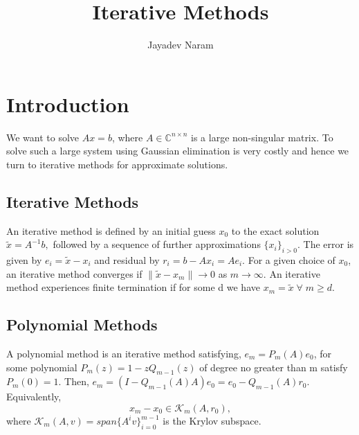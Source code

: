 \documentclass[10pt,a4paper]{article}
\author{Jayadev Naram}
\title{Iterative Methods}
\begin{document}
\maketitle 

\maketitle
 
\tableofcontents

\newpage

  
\newtheorem{theorem}{Theorem}
\newtheorem{corollary}{Corollary}[theorem]
\newtheorem{lemma}[theorem]{Lemma}
\newtheorem{mydef}{Definition}
\newtheorem*{remark}{Remark}
\newtheorem{prop}{Proposition}

\section{Introduction}

We want to solve $Ax=b$, where $A\in\mathbb{C}^{n\times n}$ is a large non-singular matrix. To solve such a large system using Gaussian elimination is very costly and hence we turn to iterative methods for approximate solutions.

\subsection{Iterative Methods}
An iterative method is defined by an initial guess $x_0$ to the exact solution $\tilde{x}=A^{-1}b,$ followed by a sequence of further approximations $\{x_i\}_{i>0}$. The error is given by $e_i=\tilde{x}-x_i$ and residual by $r_i=b-Ax_i=Ae_i.$ For a given choice of $x_0$, an iterative method converges if $\|\tilde{x}-x_m\|\rightarrow 0$ as $m\rightarrow \infty.$ An iterative method experiences finite termination if for some d we have $x_m=\tilde{x}\;\forall\;m\ge d.$

\subsection{Polynomial Methods}
A polynomial method is an iterative method satisfying, $e_m=P_m(A)e_0$, for some polynomial $P_m(z)=1-zQ_{m-1}(z)$ of degree no greater than m satisfy $P_m(0)=1$. Then, $e_m=(I-Q_{m-1}(A)A)e_0=e_0-Q_{m-1}(A)r_0.$ Equivalently,
$$x_m-x_0\in\mathcal{K}_m(A,r_0),$$
where $\mathcal{K}_m(A,v)=span\{A^iv\}^{m-1}_{i=0}$ is the Krylov subspace.
\end{document}

